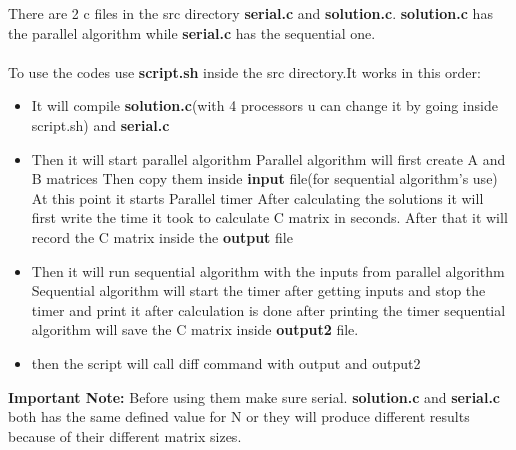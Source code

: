 There are 2 c files in the src directory \textbf{serial.c} and \textbf{solution.c}. \textbf{solution.c} has the parallel algorithm while \textbf{serial.c} has the sequential one.\\
\\
To use the codes use \textbf{script.sh} inside the src directory.It works in this order:
\begin{itemize}
	\item It will compile \textbf{solution.c}(with 4 processors u can change it by going inside script.sh) and \textbf{serial.c}
	\item Then it will start parallel algorithm
		\subitem Parallel algorithm will first create A and B matrices
		\subitem Then copy them inside \textbf{input} file(for sequential algorithm's use)
		\subitem At this point it starts Parallel timer
		\subitem After calculating the solutions it will first write the time it took to calculate C matrix in seconds.
		\subitem After that it will record the C matrix inside the \textbf{output} file
	\item Then it will run sequential algorithm with the inputs from parallel algorithm
		\subitem Sequential algorithm will start the timer after getting inputs and stop the timer and print it after calculation is done
		\subitem after printing the timer sequential algorithm will save the C matrix inside \textbf{output2} file.
	\item then the script will call diff command with output and output2
\end{itemize}
\textbf{Important Note:} Before using them make sure serial. \textbf{solution.c} and \textbf{serial.c} both has the same defined value for N or they will produce different results because of their different matrix sizes.